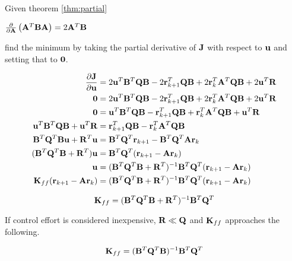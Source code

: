 Given theorem \ref{thm:partial}

\begin{theorem}
  $\frac{\partial}{\partial\mathbf{A}}\left(\mathbf{A}^T\mathbf{B}\mathbf{A}\right) =
    2\mathbf{A}^T\mathbf{B}$
  \label{thm:partial}
\end{theorem}

find the minimum by taking the partial derivative of $\mathbf{J}$ with respect to
$\mathbf{u}$ and setting that to $\mathbf{0}$.

\begin{align}
  \frac{\partial\mathbf{J}}{\partial\mathbf{u}} &=
    2\mathbf{u}^T\mathbf{B}^T\mathbf{Q}\mathbf{B} - 2\mathbf{r}_{k+1}^T\mathbf{Q}\mathbf{B} +
    2\mathbf{r}_k^T\mathbf{A}^T\mathbf{Q}\mathbf{B} + 2\mathbf{u}^T\mathbf{R} \nonumber \\
  \mathbf{0} &= 2\mathbf{u}^T\mathbf{B}^T\mathbf{Q}\mathbf{B} -
    2\mathbf{r}_{k+1}^T\mathbf{Q}\mathbf{B} + 2\mathbf{r}_k^T\mathbf{A}^T\mathbf{Q}\mathbf{B} +
    2\mathbf{u}^T\mathbf{R} \nonumber \\
  \mathbf{0} &= \mathbf{u}^T\mathbf{B}^T\mathbf{Q}\mathbf{B} - \mathbf{r}_{k+1}^T\mathbf{Q}\mathbf{B} +
    \mathbf{r}_k^T\mathbf{A}^T\mathbf{Q}\mathbf{B} + \mathbf{u}^T\mathbf{R} \nonumber \\
  \mathbf{u}^T\mathbf{B}^T\mathbf{Q}\mathbf{B} + \mathbf{u}^T\mathbf{R} &=
    \mathbf{r}_{k+1}^T\mathbf{Q}\mathbf{B} - \mathbf{r}_k^T\mathbf{A}^T\mathbf{Q}\mathbf{B}
    \nonumber \\
  \mathbf{B}^T\mathbf{Q}^T\mathbf{B}\mathbf{u} + \mathbf{R}^T\mathbf{u} &=
    \mathbf{B}^T\mathbf{Q}^T\mathbf{r}_{k+1} - \mathbf{B}^T\mathbf{Q}^T\mathbf{A}\mathbf{r}_k
    \nonumber \\
  (\mathbf{B}^T\mathbf{Q}^T\mathbf{B} + \mathbf{R}^T)\mathbf{u} &=
    \mathbf{B}^T\mathbf{Q}^T(\mathbf{r}_{k+1} - \mathbf{A}\mathbf{r}_k) \nonumber \\
  \mathbf{u} &= (\mathbf{B}^T\mathbf{Q}^T\mathbf{B} +
    \mathbf{R}^T)^{-1}\mathbf{B}^T\mathbf{Q}^T(\mathbf{r}_{k+1} - \mathbf{A}\mathbf{r}_k)
    \nonumber \\
  \mathbf{K}_{ff}(\mathbf{r}_{k+1} - \mathbf{A}\mathbf{r}_k) &=
    (\mathbf{B}^T\mathbf{Q}^T\mathbf{B} +
    \mathbf{R}^T)^{-1}\mathbf{B}^T\mathbf{Q}^T(\mathbf{r}_{k+1} - \mathbf{A}\mathbf{r}_k)
    \nonumber
\end{align}

\begin{theorem}
  \begin{equation}
    \mathbf{K}_{ff} =
      (\mathbf{B}^T\mathbf{Q}^T\mathbf{B} + \mathbf{R}^T)^{-1}\mathbf{B}^T\mathbf{Q}^T
  \end{equation}
\end{theorem}

If control effort is considered inexpensive, $\mathbf{R} \ll \mathbf{Q}$ and
$\mathbf{K}_{ff}$ approaches the following.

\begin{theorem}
  \begin{equation}
    \mathbf{K}_{ff} = (\mathbf{B}^T\mathbf{Q}^T\mathbf{B})^{-1}\mathbf{B}^T\mathbf{Q}^T
  \end{equation}
\end{theorem}
